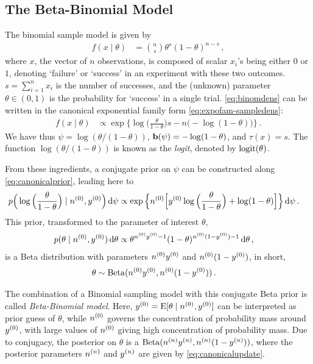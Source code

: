 \subsection{The Beta-Binomial Model}
\label{sec:beta-binom}

The binomial sample model is given by
\begin{align}
\label{eq:binomdens}
f(x\mid\theta) &= {n \choose s}\theta^s (1-\theta)^{n-s}\,,
\end{align}
where $x$, the vector of $n$ observations, is composed of scalar $x_i$'s being either $0$ or $1$,
denoting `failure' or `success' in an experiment with these two outcomes.
$s = \sum_{i=1}^n x_i$ is the number of successes,
and the (unknown) parameter $\theta \in (0,1)$ is the probability for `success' in a single trial.
\eqref{eq:binomdens} can be written in the canonical exponential family form \eqref{eq:expofam-sampledens}:
\begin{align*}
f(x\mid\theta) &\propto \exp\Big\{ \log\Big(\frac{\theta}{1-\theta}\Big) s - n \big(-\log(1-\theta)\big) \Big\} \,.
\end{align*}
We have thus $\psi = \log(\theta/(1-\theta))$, $\mathbf{b}(\psi) = -\log(1-\theta)$, and $\tau(x) = s$.
The function $\log(\theta/(1-\theta))$ is known as the \emph{logit}, denoted by $\operatorname{logit}(\theta)$.

From these ingredients, a conjugate prior on $\psi$ can be constructed along \eqref{eq:canonicalprior},
leading here to
\begin{align*}
p\Big(\log\Big(\frac{\theta}{1-\theta}\Big) \mid \nz, \yz\Big) \dd\psi %
 &\propto \exp\Big\{ \nz \Big[ \yz \log\Big(\frac{\theta}{1-\theta}\Big) + \log(1-\theta) \Big] \Big\} \dd\psi\,.
\end{align*}
This prior, transformed to the parameter of interest $\theta$,
\begin{align*}
p(\theta\mid n^{(0)}, y^{(0)})\,\mathrm{d}\theta &\propto \theta^{n^{(0)}y^{(0)} - 1} (1-\theta)^{n^{(0)}(1-y^{(0)}) - 1} \,\mathrm{d}\theta\,,
\end{align*}
is a Beta distribution with parameters $n^{(0)}y^{(0)}$ and $n^{(0)}(1-y^{(0)})$, in short, %
\begin{align*}
\theta &\sim \operatorname{Beta}(n^{(0)}y^{(0)}, n^{(0)}(1-y^{(0)}))\,.
\end{align*}

The combination of a Binomial sampling model with this conjugate Beta prior is called \emph{Beta-Binomial model}.
Here, $y^{(0)} = \operatorname{E}[\theta\mid n^{(0)}, y^{(0)}]$ can be interpreted as prior guess of $\theta$,
while $n^{(0)}$ governs the concentration of probability mass around $y^{(0)}$,
with large values of $n^{(0)}$ giving high concentration of probability mass.
Due to conjugacy, the posterior on $\theta$ is a $\operatorname{Beta}(n^{(n)}y^{(n)}, n^{(n)}(1-y^{(n)}))$,
where the posterior parameters $n^{(n)}$ and $y^{(n)}$ are given by \eqref{eq:canonicalupdate}.

